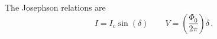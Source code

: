 \documentclass{article}
\author{Daniel Sank}
\date{17 November 2018}
\begin{document}
The Josephson relations are
\begin{equation}
  I = I_c \sin(\delta)
  \qquad
  V = \left( \frac{\Phi_0}{2 \pi} \right) \dot{\delta} \, .
\end{equation}
\end{document}
